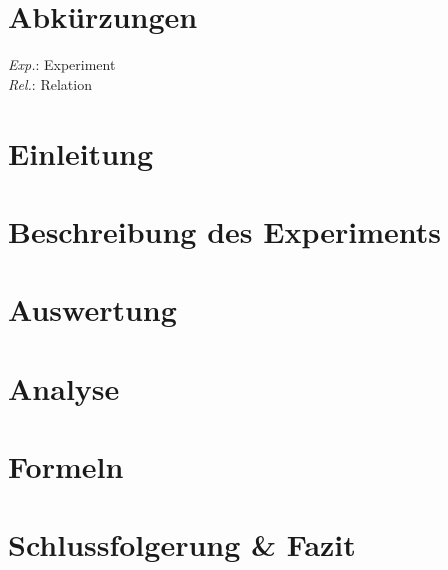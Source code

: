 \documentclass[12pt,twoside,a4paper,titlepage]{article}
\title{\titleText}
\author{\authorText}
\date{\dateText}
\begin{document}
	\maketitle
	\tableofcontents

	\section*{Abkürzungen}
	
	\begin{multicols}{3}
		\textit{Exp.}: Experiment\\
		\textit{Rel.}: Relation \\
	\end{multicols}
	
	\clearpage

    \section{Einleitung}
    
   	
    
    \section{Beschreibung des Experiments}

	
    
    \section{Auswertung}

	
    
    \section{Analyse}

	

    \section{Formeln}
	
	
    
    \section{Schlussfolgerung \& Fazit}
    
    
    
    
\end{document}
